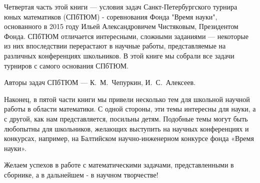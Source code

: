 \aabz Четвертая часть этой книги — условия задач  Санкт-Петербургского  турнира юных математиков (СПбТЮМ) - соревнования Фонда "Время науки", основанного в 2015 году Ильей Александровичем Чистяковым, Президентом Фонда. СПбТЮМ отличается интересными, сложными заданиями — некоторые из них впоследствии перерастают в научные работы, представляемые на различных конференциях школьников. В этой книге мы собрали все задачи турниров с самого основания СПбТЮМ.

\aabz Авторы задач СПбТЮМ — К.~М.~Чепуркин, И.~С.~Алексеев.

\thispagestyle{empty}

\aabz Наконец, в пятой части книги мы привели несколько тем для школьной научной работы  в области математики. С одной стороны, эти темы  интересны для науки, а с другой, как нам представляется, посильны детям. Подобные темы могут быть любопытны для школьников, желающих выступить на научных конференциях и конкурсах, например, на Балтийском научно-инженерном конкурсе фонда «Время науки».

\aabz Желаем  успехов в  работе с  математическими задачами, представленными в сборнике, а в дальнейшем - в научном творчестве!

